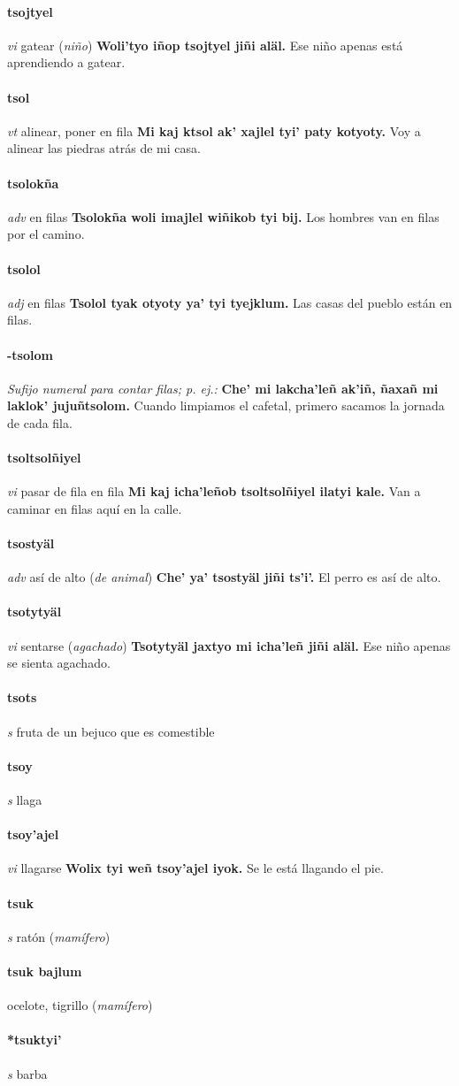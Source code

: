 \documentclass{scrbook}
\newcommand{\entry}[1]{\paragraph{#1}}
\newcommand{\nontranslationdef}[1]{\textit{#1}}
\newcommand{\partofspeech}[1]{\textit{#1}}
\newcommand{\spanishtranslation}[1]{#1}
\newcommand{\clarification}[1]{(\textit{#1})}
\newcommand{\cholexample}[1]{\textbf{#1}}
\newcommand{\exampletranslation}[1]{#1}
\begin{document}
\begin{multicols}{2}
\entry{tsojtyel}
\partofspeech{vi}
\spanishtranslation{gatear}
\clarification{niño}
\cholexample{Woli'tyo iñop tsojtyel jiñi aläl.}
\exampletranslation{Ese niño apenas está aprendiendo a gatear.}

\entry{tsol}
\partofspeech{vt}
\spanishtranslation{alinear, poner en fila}
\cholexample{Mi kaj ktsol ak' xajlel tyi' paty kotyoty.}
\exampletranslation{Voy a alinear las piedras atrás de mi casa.}

\entry{tsolokña}
\partofspeech{adv}
\spanishtranslation{en filas}
\cholexample{Tsolokña woli imajlel wiñikob tyi bij.}
\exampletranslation{Los hombres van en filas por el camino.}

\entry{tsolol}
\partofspeech{adj}
\spanishtranslation{en filas}
\cholexample{Tsolol tyak otyoty ya' tyi tyejklum.}
\exampletranslation{Las casas del pueblo están en filas.}

\entry{-tsolom}
\nontranslationdef{Sufijo numeral para contar filas; p. ej.:}
\cholexample{Che' mi lakcha'leñ ak'iñ, ñaxañ mi laklok' jujuñtsolom.}
\exampletranslation{Cuando limpiamos el cafetal, primero sacamos la jornada de cada fila.}

\entry{tsoltsolñiyel}
\partofspeech{vi}
\spanishtranslation{pasar de fila en fila}
\cholexample{Mi kaj icha'leñob tsoltsolñiyel ilatyi kale.}
\exampletranslation{Van a caminar en filas aquí en la calle.}

\entry{tsostyäl}
\partofspeech{adv}
\spanishtranslation{así de alto}
\clarification{de animal}
\cholexample{Che' ya' tsostyäl jiñi ts'i'.}
\exampletranslation{El perro es así de alto.}

\entry{tsotytyäl}
\partofspeech{vi}
\spanishtranslation{sentarse}
\clarification{agachado}
\cholexample{Tsotytyäl jaxtyo mi icha'leñ jiñi aläl.}
\exampletranslation{Ese niño apenas se sienta agachado.}

\entry{tsots}
\partofspeech{s}
\spanishtranslation{fruta de un bejuco que es comestible}

\entry{tsoy}
\partofspeech{s}
\spanishtranslation{llaga}

\entry{tsoy'ajel}
\partofspeech{vi}
\spanishtranslation{llagarse}
\cholexample{Wolix tyi weñ tsoy'ajel iyok.}
\exampletranslation{Se le está llagando el pie.}

\entry{tsuk}
\partofspeech{s}
\spanishtranslation{ratón}
\clarification{mamífero}

\entry{tsuk bajlum}
\spanishtranslation{ocelote, tigrillo}
\clarification{mamífero}

\entry{*tsuktyi'}
\partofspeech{s}
\spanishtranslation{barba}


\end{multicols}
\end{document}
